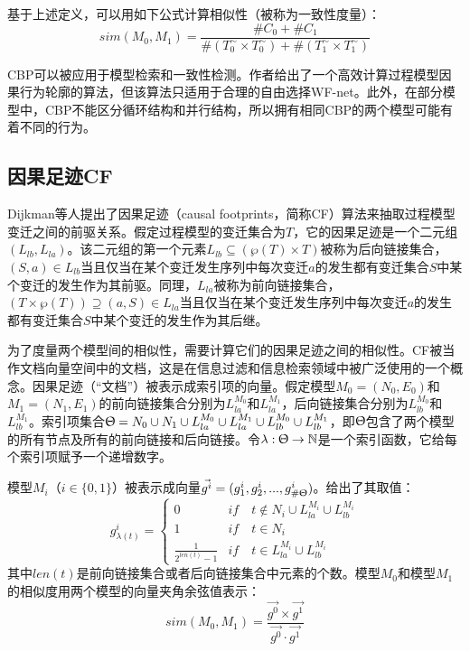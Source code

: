 基于上述定义，可以用如下公式计算相似性（被称为一致性度量）：
\begin{displaymath}
  sim(M_{0},M_{1})=\frac{\#C_{0}+\#C_{1}}{\#(T_{0}^{\sim}\times T_{0}^{\sim})+\#(T_{1}^{\sim}\times T_{1}^{\sim})}
\end{displaymath}

CBP可以被应用于模型检索和一致性检测。作者给出了一个高效计算过程模型因果行为轮廓的算法\cite{weidlich2010efficient}，但该算法只适用于合理的自由选择WF-net。此外，在部分模型中，CBP不能区分循环结构和并行结构，所以拥有相同CBP的两个模型可能有着不同的行为。

\subsection{因果足迹CF}\label{subsec:cf}
Dijkman等人提出了因果足迹（causal footprints，简称CF）算法来抽取过程模型变迁之间的前驱关系\cite{dijkman2011similarity}。假定过程模型的变迁集合为$T$，它的因果足迹是一个二元组$(L_{lb},L_{la})$。该二元组的第一个元素$L_{lb}\subseteq (\wp(T)\times T)$被称为后向链接集合，$(S,a)\in L_{lb}$当且仅当在某个变迁发生序列中每次变迁$a$的发生都有变迁集合$S$中某个变迁的发生作为其前驱。同理，$L_{la}$被称为前向链接集合，$(T\times\wp(T))\supseteq(a,S)\in L_{la}$当且仅当在某个变迁发生序列中每次变迁$a$的发生都有变迁集合$S$中某个变迁的发生作为其后继。

为了度量两个模型间的相似性，需要计算它们的因果足迹之间的相似性。CF被当作文档向量空间中的文档，这是在信息过滤和信息检索领域中被广泛使用的一个概念\cite{salton1975vector}。因果足迹（“文档”）被表示成索引项的向量。假定模型$M_{0}=(N_{0},E_{0})$和$M_{1}=(N_{1},E_{1})$的前向链接集合分别为$L_{la}^{M_{0}}$和$L_{la}^{M_{1}}$，后向链接集合分别为$L_{lb}^{M_{0}}$和$L_{lb}^{M_{1}}$。索引项集合$\Uptheta=N_{0}\cup N_{1}\cup L_{la}^{M_{0}}\cup L_{la}^{M_{1}}\cup L_{lb}^{M_{0}}\cup L_{lb}^{M_{1}}$，即$\Uptheta$包含了两个模型的所有节点及所有的前向链接和后向链接。令$\lambda:\Uptheta\rightarrow\mathbb{N}$是一个索引函数，它给每个索引项赋予一个递增数字。

模型$M_{i}$（$i\in\{0,1\}$）被表示成向量$\vec{g^{i}}=(g_{1}^{i},g_{2}^{i},...,g_{\#\Uptheta}^{i})$。给出了其取值：
\begin{displaymath}
  g{_{\lambda(t)}^i}=
    \begin{cases}
        0& if\quad t\notin N_i\cup L{_{la}^{M_i}}\cup L{_{lb}^{M_i}}\\
        1& if\quad t\in N_i\\
        \frac{1}{2^{len(t)}-1}& if\quad t\in L{_{la}^{M_i}}\cup L{_{lb}^{M_i}}
    \end{cases}
\end{displaymath}
其中$len(t)$是前向链接集合或者后向链接集合中元素的个数。模型$M_{0}$和模型$M_{1}$的相似度用两个模型的向量夹角余弦值表示：
\begin{displaymath}
  sim(M_{0},M_{1})=\frac{\vec{g^{0}}\times\vec{g^{1}}}{\vec{g^{0}}\cdot\vec{g^{1}}}
\end{displaymath}


